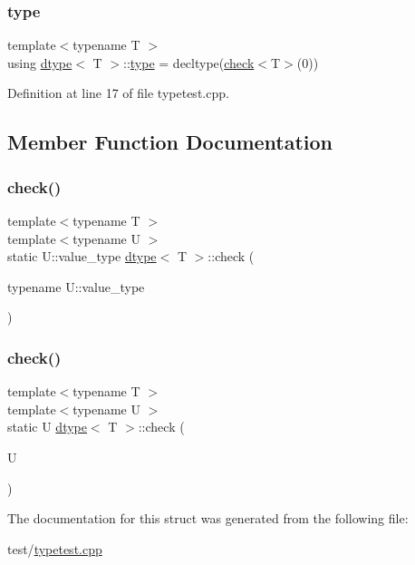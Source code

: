 \subsubsection{\texorpdfstring{type}{type}}
{\footnotesize\ttfamily template$<$typename T $>$ \\
using \mbox{\hyperlink{structdtype}{dtype}}$<$ T $>$\+::\mbox{\hyperlink{structdtype_a2c7a9959a8b61a98cc065f03eaa79e89}{type}} =  decltype(\mbox{\hyperlink{structdtype_a70fa7f25bb22166e7788e045e62f6a64}{check}}$<$T$>$(0))}



Definition at line 17 of file typetest.\+cpp.



\subsection{Member Function Documentation}
\mbox{\label{structdtype_a70fa7f25bb22166e7788e045e62f6a64}} 
\subsubsection{\texorpdfstring{check()}{check()}\hspace{0.1cm}{\footnotesize\ttfamily [1/2]}}
{\footnotesize\ttfamily template$<$typename T $>$ \\
template$<$typename U $>$ \\
static U\+::value\+\_\+type \mbox{\hyperlink{structdtype}{dtype}}$<$ T $>$\+::check (\begin{DoxyParamCaption}\item[{typename U\+::value\+\_\+type}]{ }\end{DoxyParamCaption})\hspace{0.3cm}{\ttfamily [static]}}

\mbox{\label{structdtype_a01282018f55ad532f28b1605af093999}} 
\subsubsection{\texorpdfstring{check()}{check()}\hspace{0.1cm}{\footnotesize\ttfamily [2/2]}}
{\footnotesize\ttfamily template$<$typename T $>$ \\
template$<$typename U $>$ \\
static U \mbox{\hyperlink{structdtype}{dtype}}$<$ T $>$\+::check (\begin{DoxyParamCaption}\item[{U}]{ }\end{DoxyParamCaption})\hspace{0.3cm}{\ttfamily [static]}}



The documentation for this struct was generated from the following file\+:\begin{DoxyCompactItemize}
\item 
test/\mbox{\hyperlink{typetest_8cpp}{typetest.\+cpp}}\end{DoxyCompactItemize}

